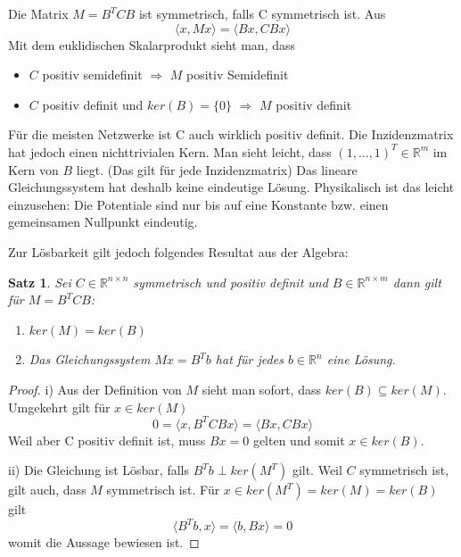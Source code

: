 \documentclass[11pt,titlepage]{article}
\begin{document}
		Die Matrix $M = B^T C B$ ist symmetrisch, falls C symmetrisch ist. Aus
		\begin{displaymath}
			\langle x,Mx \rangle = \langle Bx, CBx \rangle
		\end{displaymath}
		Mit dem euklidischen Skalarprodukt sieht man, dass
		\begin{itemize}
			\item $C$ positiv semidefinit $\Rightarrow$ $M$ positiv Semidefinit
			\item $C$ positiv definit und $ker(B)= \{ 0 \}$ $\Rightarrow$ $M$ positiv definit
		\end{itemize}
	
		Für die meisten Netzwerke ist C auch wirklich positiv definit. Die Inzidenzmatrix hat jedoch einen nichttrivialen Kern. Man sieht leicht, dass $(1,...,1)^T \in \mathbb{R}^m$ im Kern von $B$ liegt. (Das gilt für jede Inzidenzmatrix) Das lineare Gleichungssystem hat deshalb keine eindeutige Lösung. Physikalisch ist das leicht einzusehen: Die Potentiale sind nur bis auf eine Konstante bzw. einen gemeinsamen Nullpunkt eindeutig.
		
		Zur Lösbarkeit gilt jedoch folgendes Resultat aus der Algebra:
		
		\newtheorem{Satz}{Satz}
		\begin{Satz}
			Sei $C \in \mathbb{R}^{n \times n}$ symmetrisch und positiv definit und $B \in \mathbb{R}^{n \times m}$ dann gilt für $M = B^TCB$:
			\begin{enumerate}
				\item $ker(M) = ker(B)$
				\item Das Gleichungssystem $Mx = B^Tb$ hat für jedes $b \in \mathbb{R}^n$ eine Lösung.
			\end{enumerate}
		\end{Satz}
		\begin{proof}
			i) Aus der Definition von $M$ sieht man sofort, dass $ker(B) \subseteq ker(M)$.
			Umgekehrt gilt für $x \in ker(M)$
			\begin{displaymath}
				0 = \langle x, B^TCBx \rangle = \langle Bx, CBx \rangle
			\end{displaymath}
			Weil aber C positiv definit ist, muss $Bx = 0$ gelten und somit $x \in ker(B)$.
			
			ii) Die Gleichung ist Lösbar, falls $B^Tb \perp ker(M^T)$ gilt. Weil $C$ symmetrisch ist, gilt auch, dass $M$ symmetrisch ist. Für $x \in ker(M^T) = ker(M) = ker(B)$ gilt
			\begin{displaymath}
				\langle B^Tb, x \rangle = \langle b, Bx \rangle = 0
			\end{displaymath}
			womit die Aussage bewiesen ist.
		\end{proof}
		
\end{document}

